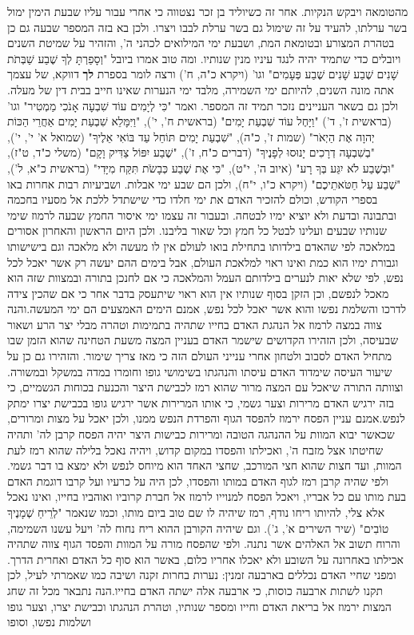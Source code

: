 \documentclass[12pt, openany]{book}
\begin{document}
מהטומאה ויבקש הנקיות. אחר זה כשיוליד בן זכר נצטווה כי אחרי עבור עליו שבעת הימין ימול בשר ערלתו, להעיד על זה שימול גם בשר ערלת לבבו ויצרו. ולכן בא בזה המספר שבעה גם כן בטהרת המצורע ובטומאת המת, ושבעת ימי המילואים לכהני ה', והזהיר על שמיטת השנים ויובלים כדי שתמיד יהיה לנגד עיניו מנין שנותיו. ומה טוב אמרו ביובל "וְסָפַרְתָּ לְךָ שֶׁבַע שַׁבְּתֹת שָׁנִים שֶׁבַע שָׁנִים שֶׁבַע פְּעָמִים" וגו' (ויקרא כ"ה, ח') ורצה לומר בספרת \textrm{\textbf{לך}} דווקא, של עצמך אתה מונה השנים, להיותם ימי השמירה, מלבד ימי הנערות שאינו חייב בבית דין של מעלה. ולכן גם בשאר העניינים נזכר תמיד זה המספר. ואמר "כִּי לְיָמִים עוֹד שִׁבְעָה אָנֹכִי מַמְטִיר" וגו' (בראשית ז', ד') "וַיָּחֶל עוֹד שִׁבְעַת יָמִים" (בראשית ח', י'),  "וַיִּמָּלֵא שִׁבְעַת יָמִים אַחֲרֵי הַכּוֹת יְהוָה אֶת הַיְאֹר" (שמות ז', כ"ה), "שִׁבְעַת יָמִים תּוֹחֵל עַד בּוֹאִי אֵלֶיךָ" (שמואל א' י', י'), "בְשִׁבְעָה דְרָכִים יָנוּסוּ לְפָנֶיךָ" (דברים כ"ח, ז'), "שֶׁבַע יִפּוֹל צַדִּיק וָקָם" (משלי כ"ד, ט"ז), "וּבְשֶׁבַע לֹא יִגַּע בְּךָ רָע" (איוב ה', י"ט), "כִּי אֶת שֶׁבַע כְּבָשֹׂת תִּקַּח מִיָּדִי" (בראשית כ"א, ל'), "שֶׁבַע עַל חַטֹּאתֵיכֶם" (ויקרא כ"ו, י"ח), ולכן הם שבע ימי אבלות. ושביעיות רבות אחרות באו בספרי הקודש, וכולם להזכיר האדם את ימי חלדו כדי שישתדל ללכת אל מסעיו בחכמה ובתבונה ובדעת ולא יוציא ימיו לבטחה. ובעבור זה עצמו ימי איסור החמץ שבעה לרמוז שימי שנותיו שבעים ועלינו לבטל כל חמץ וכל שאור בליבנו. ולכן היום הראשון והאחרון אסורים במלאכה לפי שהאדם בילדותו בתחילת בואו לעולם אין לו מעשה ולא מלאכה וגם בישישותו וגבורת ימיו הוא כמת ואינו ראוי למלאכת העולם, אבל בימים ההם יעשה רק אשר יאכל לכל נפש, לפי שלא יאות לנערים בילדותם העמל והמלאכה כי אם לחנכן בתורה ובמצוות שזה הוא מאכל לנפשם, וכן הזקן בסוף שנותיו אין הוא ראוי שיתעסק בדבר אחר כי אם שהכין צידה לדרכו והשלמת נפשו והוא אשר יאכל לכל נפש, אמנם הימים האמצעים הם ימי המעשה.והנה צווה במצה לרמוז אל הנהגת האדם בחייו שתהיה בתמימות וטהרה מבלי יצר הרע ושאור שבעיסה, ולכן הזהירו הקדושים שישמר האדם בעניין המצה משעת הטחינה שהוא הזמן שבו מתחיל האדם לסבוב ולטחון אחרי ענייני העולם הזה כי מאז צריך שימור. והזהירו גם כן על שיעור העיסה שימדוד האדם עיסתו והנהגתו בשימושי גופו וחומרו במדה במשקל ובמשורה. וצוותה התורה שיאכל עם המצה מרור שהוא רמז לכבישת היצר והכנעת בכוחות הגשמיים, כי בזה ירגיש האדם מרירות וצער גשמי, כי אותו המרירות אשר ירגיש גופו בכבישת יצרו ימתק לנפש.אמנם עניין הפסח ירמוז להפסד הגוף והפרדת הנפש ממנו, ולכן יאכל על מצות ומרורים, שכאשר יבוא המוות על ההנהגה הטובה ומרירות כבישות היצר יהיה הפסח קרבן לה' ותהיה שחיטתו אצל מזבח ה', ואכילתו והפסדו במקום קדוש, ויהיה נאכל בלילה שהוא רמז לעת המוות, ועד חצות שהוא חצי המורכב, שחצי האחד הוא מיוחס לנפש ולא ימצא בו דבר גשמי. ולפי שהיה קרבן רמז לגוף האדם במותו והפסדו, לכן היה על כרעיו ועל קרבו דוגמת האדם בעת מותו עם כל אבריו, ויאכל הפסח למנוייו לרמוז אל חברת קרוביו ואוהביו בחייו, ואינו נאכל אלא צלי, להיותו ריחו נודף, רמז שיהיה לו שם טוב ביום מותו, וכמו שנאמר "לְרֵיחַ שְׁמָנֶיךָ טוֹבִים" (שיר השירים א', ג'). וגם שיהיה הקורבן ההוא ריח נחוח לה' ויעל עשנו השמימה, והרוח תשוב אל האלהים אשר נתנה. ולפי שהפסח מורה על המוות והפסד הגוף צווה שתהיה אכילתו באחרונה על השובע ולא יאכלו אחריו כלום, באשר הוא סוף כל האדם ואחרית הדרך. ומפני שחיי האדם נכללים בארבעה זמנין: נערות בחרות זקנה ושיבה כמו שאמרתי לעיל, לכן תקנו לשתות ארבעה כוסות, כי ארבעה אלה ישתה האדם בחייו.הנה נתבאר מכל זה שחג המצות ירמוז אל בריאת האדם וחייו ומספר שנותיו, וטהרת הנהגתו וכבישת יצרו, וצער גופו ושלמות נפשו, וסופו 
\end{document}
